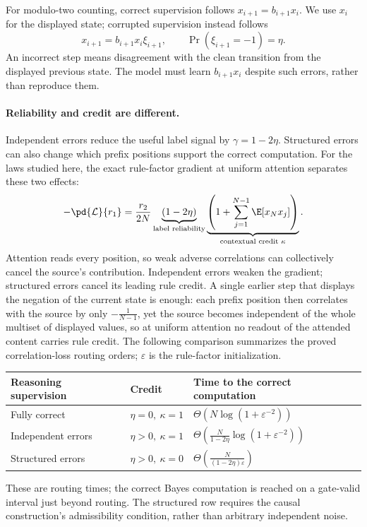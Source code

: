 For modulo-two counting, correct supervision follows $x_{i+1}=b_{i+1}x_i$.
We use $x_i$ for the displayed state; corrupted supervision instead follows
\[
 x_{i+1}=b_{i+1}x_i\xi_{i+1},\qquad \Pr(\xi_{i+1}=-1)=\eta.
\]
An incorrect step means disagreement with the clean transition from the displayed previous state.
The model must learn $b_{i+1}x_i$ despite such errors, rather than reproduce them.

\paragraph{Reliability and credit are different.}
Independent errors reduce the useful label signal by $\gamma=1-2\eta$.
Structured errors can also change which prefix positions support the correct computation.
For the laws studied here, the exact rule-factor gradient at uniform attention separates these two effects:
\[
 -\pd{\mathcal L}{r_1}
 =\frac{r_2}{2N}
 \underbrace{(1-2\eta)}_{\text{label reliability}}
 \underbrace{\left(1+\sum_{j=1}^{N-1}\E[x_Nx_j]\right)}_{\text{contextual credit }\kappa}.
\]
Attention reads every position, so weak adverse correlations can collectively cancel the source's contribution.
Independent errors weaken the gradient; structured errors cancel its leading rule credit.
A single earlier step that displays the negation of the current state is enough: each prefix position then correlates with the source by only $-\tfrac{1}{N-1}$,
yet the source becomes independent of the whole multiset of displayed values, so at uniform attention no readout of the attended content carries rule credit.
The following comparison summarizes the proved correlation-loss routing orders; $\varepsilon$ is the rule-factor initialization.
\begin{center}\small
\begin{tabular}{@{}lll@{}}
\toprule
Reasoning supervision & Credit & Time to the correct computation\\
\midrule
Fully correct & $\eta=0,\ \kappa=1$ & $\Theta(N\log(1+\varepsilon^{-2}))$\\
Independent errors & $\eta>0,\ \kappa=1$ & $\Theta(\tfrac{N}{1-2\eta}\log(1+\varepsilon^{-2}))$\\
Structured errors & $\eta>0,\ \kappa=0$ & $\Theta(\tfrac{N}{(1-2\eta)\varepsilon})$\\
\bottomrule
\end{tabular}\end{center}
These are routing times; the correct Bayes computation is reached on a gate-valid interval just beyond routing.
The structured row requires the causal construction's admissibility condition, rather than arbitrary independent noise.

